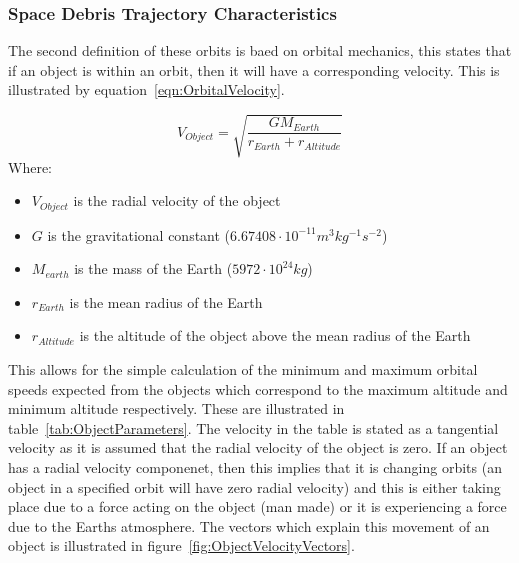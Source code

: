 \documentclass[11pt]{witseiepaper}
\begin{document}
\subsubsection{Space Debris Trajectory Characteristics} \label{sec:SpaceDebrisTrajectoryCharacteristics}

The second definition of these orbits is baed on orbital mechanics, this states that if an object is within an orbit, then it will have a corresponding velocity.
This is illustrated by equation~\ref{eqn:OrbitalVelocity}. 

\begin{equation} \label{eqn:OrbitalVelocity}
    V_{Object} = \sqrt{\frac{G M_{Earth}}{r_{Earth} + r_{Altitude}}}
\end{equation}
Where:
\begin{itemize}
    \item $V_{Object}$ is the radial velocity of the object
    \item $G$ is the gravitational constant ($6.67408 \cdot 10^{-11} m^3 kg^{-1} s^{-2}$)
    \item $M_{earth}$ is the mass of the Earth ($5972 \cdot 10^{24} kg$)
    \item $r_{Earth}$ is the mean radius of the Earth
    \item $r_{Altitude}$ is the altitude of the object above the mean radius of the Earth
\end{itemize}

This allows for the simple calculation of the minimum and maximum orbital speeds expected from the objects which correspond to the maximum altitude and minimum altitude respectively. These are illustrated in table~\ref{tab:ObjectParameters}. The velocity in the table is stated as a tangential velocity as it is assumed that the radial velocity of the object is zero. If an object has a radial velocity componenet, then this implies that it is changing orbits (an object in a specified orbit will have zero radial velocity) and this is either taking place due to a force acting on the object (man made) or it is experiencing a force due to the Earths atmosphere. The vectors which explain this movement of an object is illustrated in figure~\ref{fig:ObjectVelocityVectors}.
\end{document}

